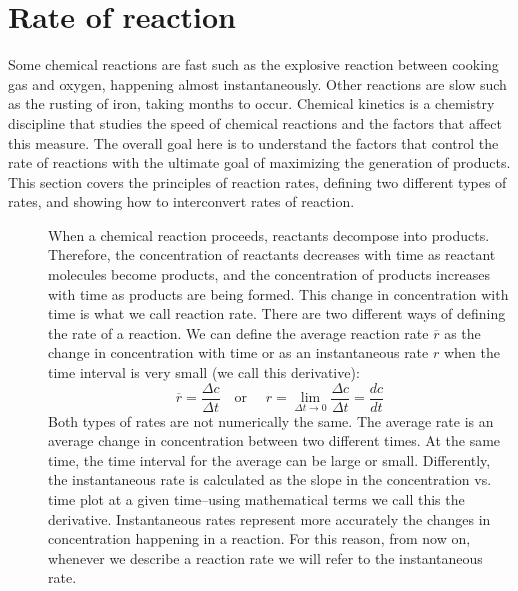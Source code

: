 \documentclass[main.tex]{subfiles}
\newcommand\chapterlabel{kinetics}
\begin{document}
\section{Rate of reaction}
Some chemical reactions are fast such as the explosive reaction between cooking gas and oxygen, happening almost instantaneously. Other reactions are slow such as the rusting of iron, taking months to occur. Chemical kinetics is a chemistry discipline that studies the speed of chemical reactions and the factors that affect this measure. The overall goal here is to understand the factors that control the rate of reactions with the ultimate goal of maximizing the generation of products. This section covers the principles of reaction rates, defining two different types of rates, and showing how to interconvert rates of reaction.
\sloppy 
\begin{description}
\item[] 
When a chemical reaction proceeds, reactants decompose into products. Therefore, the concentration of reactants decreases with time as reactant molecules become products, and the concentration of products increases with time as products are being formed. This change in concentration with time is what we call reaction rate. There are two different ways of defining the rate of a reaction. We can define the average reaction rate $\overline{r}$ as the change in concentration with time or as an instantaneous rate $r$ when the time interval is very small (we call this derivative):
\begin{equation}
\boxed{\overline{r}=\frac{\Delta c}{\Delta t} 
\quad  \text{or }\quad 
 r=\lim\limits_{\Delta t \to 0}     \frac{\Delta c}{\Delta t}=\frac{d c}{d t}}
\label{\chapterlabel:equation1}
\end{equation}
Both types of rates are not numerically the same. The average rate is an average change in concentration between two different times. At the same time, the time interval for the average can be large or small.
Differently, the instantaneous rate is calculated as the slope in the concentration vs. time plot at a given time--using mathematical terms we call this the derivative. Instantaneous rates represent more accurately the changes in concentration happening in a reaction. For this reason, from now on, whenever we describe a reaction rate we will refer to the instantaneous rate.
\item[] 

\end{description}
\end{document}
